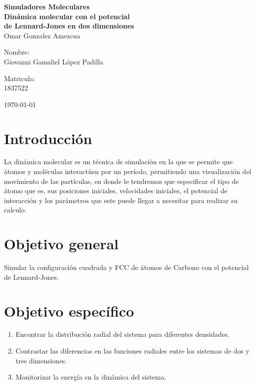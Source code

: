 \documentclass[reprint,amsmath,amssymb,aps,]{revtex4-2}
\begin{document}
\begin{titlepage}
\begin{center}
\begin{large}
\vspace{1cm}
\large{\textbf{Simuladores Moleculares}}\\
\textbf{Dinámica molecular con el potencial \\ de Lennard-Jones en dos dimensiones}\\
Omar Gonzalez Amezcua\\
\end{large}
\vspace{3.5cm}
\begin{minipage}{0.6\linewidth}
\vspace{0.5cm}
\changefontsizes{14pt}
Nombre:\\
Giovanni Gamaliel López Padilla\\
\end{minipage}
\begin{minipage}{0.2\linewidth}
\changefontsizes{14pt}
Matricula:\\
1837522
\end{minipage}
\end{center}
\vspace{4cm}
\begin{flushright}
\today
\end{flushright}
\pagebreak
\end{titlepage}
\maketitle
\section{Introducción}
La dinámica molecular es un técnica de simulación en la que se permite que átomos y moléculas interactúen por un período,
 permitiendo una visualización del movimiento de las partículas, en donde le tendremos que especificar el tipo de átomo que es,
  sus posiciones iniciales, velocidades iniciales, el potencial de interacción y los parámetros que este puede llegar a necesitar 
  para realizar su calculo.\\
\section{Objetivo general}
Simular la configuración cuadrada y FCC de átomos de Carbono con el potencial de Lennard-Jones.
\section{Objetivo específico}
\begin{enumerate}
    \item Encontrar la distribución radial del sistema para diferentes densidades.
    \item Contrastar las diferencias en las funciones radiales entre los sistemas de dos y tres dimensiones.
    \item Monitorizar la energía en la dinámica del sistema.
\end{enumerate}
\end{document}
